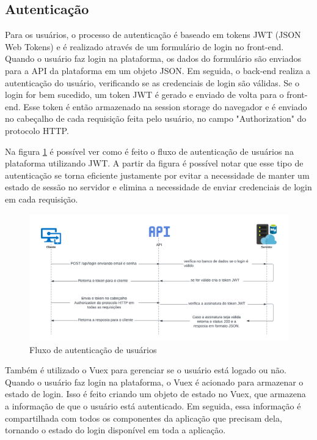 \documentclass[tcc,capa]{texufpel}
\begin{document}
\subsection{Autenticação}
\label{sec:autenticacao}
Para os usuários, o processo de autenticação é baseado em tokens JWT (JSON Web Tokens) e é realizado através de um formulário de login no front-end. Quando o usuário faz login na plataforma, os dados do formulário são enviados para a API da plataforma em um objeto JSON. Em seguida, o back-end realiza a autenticação do usuário, verificando se as credenciais de login são válidas. Se o login for bem sucedido, um token JWT é gerado e enviado de volta para o front-end. Esse token é então armazenado na session storage do navegador e é enviado no cabeçalho de cada requisição feita pelo usuário, no campo "Authorization" \space do protocolo HTTP.

Na figura \ref{jwtuser} é possível ver como é feito o fluxo de autenticação de usuários na plataforma utilizando JWT. A partir da figura é possível notar que esse tipo de autenticação se torna eficiente justamente por evitar a necessidade de manter um estado de sessão no servidor e elimina a necessidade de enviar credenciais de login em cada requisição.

\begin{figure}[htbp]
  \centering \includegraphics[scale=.5]{assets/jwtauth.png}
  \caption{Fluxo de autenticação de usuários}
  \label{jwtuser}
\end{figure}


Também é utilizado o Vuex para gerenciar se o usuário está logado ou não. Quando o usuário faz login na plataforma, o Vuex é acionado para armazenar o estado de login. Isso é feito criando um objeto de estado no Vuex, que armazena a informação de que o usuário está autenticado. Em seguida, essa informação é compartilhada com todos os componentes da aplicação que precisam dela, tornando o estado do login disponível em toda a aplicação.
\end{document}
